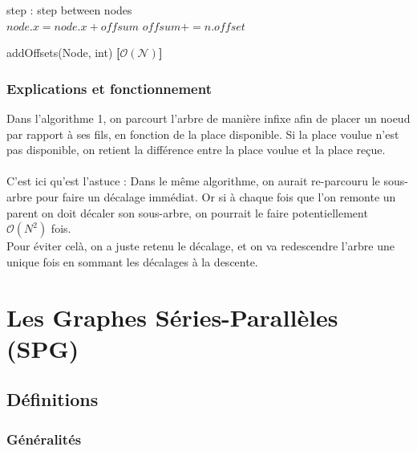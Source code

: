 \documentclass[11pt]{article}
\begin{document}
\begin{algorithm}[H]
step : step between nodes\\
 $node.x = node.x + offsum$\;
 $ offsum += n.offset$\;
 \caption{addOffsets(Node, int) \textbf{[$\mathcal{O(N)}$]}}
\end{algorithm}
\subsubsection{Explications et fonctionnement}
Dans l'algorithme 1, on parcourt l'arbre de manière infixe afin de placer un noeud par rapport à ses fils, en fonction de la place disponible. Si la place voulue n'est pas disponible, on retient la différence entre la place voulue et la place reçue.\\
\\
C'est ici qu'est l'astuce :
Dans le même algorithme, on aurait re-parcouru le sous-arbre pour faire un décalage immédiat. Or si à chaque fois que l'on remonte un parent on doit décaler son sous-arbre, on pourrait le faire potentiellement \textbf{$\mathcal{O}(N^2)$} fois.\\
Pour éviter celà, on a juste retenu le décalage, et on va redescendre l'arbre une unique fois en sommant les décalages à la descente.\\





\section{Les Graphes Séries-Parallèles (SPG)}
\subsection{Définitions}
\subsubsection{Généralités}
\end{document}

